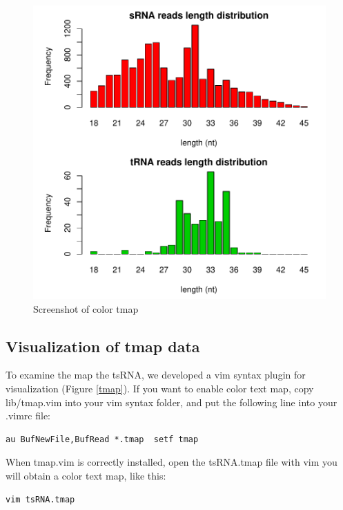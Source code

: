 \documentclass[11pt, a4paper]{article}
\begin{document}
\begin{figure}[htbp]
\begin{center}
\includegraphics[width=12cm]{distribution.pdf}
\caption{Screenshot of color tmap} 
\label{distribution}
\end{center}
\end{figure}

\subsection{Visualization of tmap data}

To examine the map the tsRNA, we developed a vim syntax plugin for visualization (Figure \ref{tmap}). If you want to enable color text map, copy lib/tmap.vim into your vim syntax folder, and put the following line into your .vimrc file:

\begin{verbatim}
au BufNewFile,BufRead *.tmap  setf tmap
\end{verbatim}

When tmap.vim is correctly installed, open the tsRNA.tmap file with vim you will obtain a color text map, like this:

\begin{verbatim}
vim tsRNA.tmap
\end{verbatim}
\end{document}

